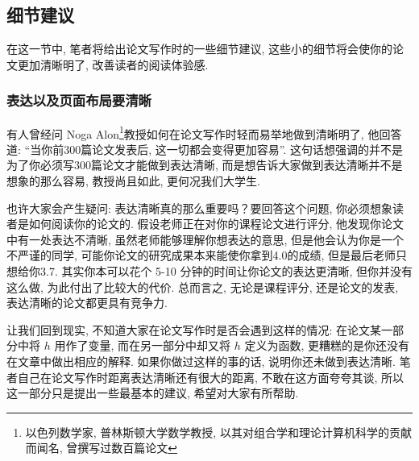 \documentclass{formatBook}
\begin{document}
\subsection{细节建议}
在这一节中, 笔者将给出论文写作时的一些细节建议, 这些小的细节将会使你的论文更加清晰明了, 改善读者的阅读体验感. 
\subsubsection{表达以及页面布局要清晰}
有人曾经问 Noga Alon\footnote{以色列数学家, 普林斯顿大学数学教授, 以其对组合学和理论计算机科学的贡献而闻名, 曾撰写过数百篇论文}教授如何在论文写作时轻而易举地做到清晰明了, 他回答道: “当你前300篇论文发表后, 这一切都会变得更加容易”\cite{pakhow}. 这句话想强调的并不是为了你必须写300篇论文才能做到表达清晰, 而是想告诉大家做到表达清晰并不是想象的那么容易, 教授尚且如此, 更何况我们大学生. \par
也许大家会产生疑问: 表达清晰真的那么重要吗？要回答这个问题, 你必须想象读者是如何阅读你的论文的. 假设老师正在对你的课程论文进行评分, 他发现你论文中有一处表达不清晰, 虽然老师能够理解你想表达的意思, 但是他会认为你是一个不严谨的同学, 可能你论文的研究成果本来能使你拿到4.0的成绩, 但是最后老师只想给你3.7. 其实你本可以花个 5-10 分钟的时间让你论文的表达更清晰, 但你并没有这么做, 为此付出了比较大的代价. 总而言之, 无论是课程评分, 还是论文的发表, 表达清晰的论文都更具有竞争力. \par
让我们回到现实, 不知道大家在论文写作时是否会遇到这样的情况: 在论文某一部分中将 $h$ 用作了变量, 而在另一部分中却又将 $h$ 定义为函数, 更糟糕的是你还没有在文章中做出相应的解释. 如果你做过这样的事的话, 说明你还未做到表达清晰. 笔者自己在论文写作时距离表达清晰还有很大的距离, 不敢在这方面夸夸其谈, 所以这一部分只是提出一些最基本的建议, 希望对大家有所帮助. 
\end{document}
